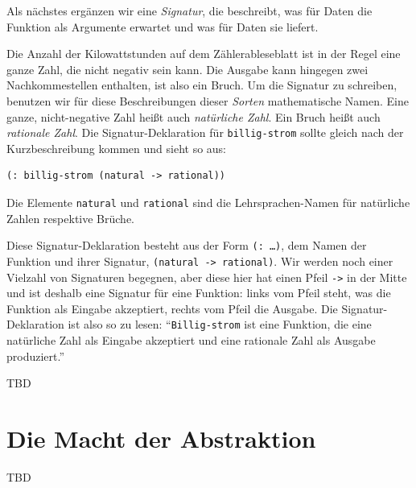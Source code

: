 Als nächstes ergänzen wir eine \textit{Signatur}, die
beschreibt, was für Daten die Funktion als Argumente erwartet und was
für Daten sie liefert.

Die Anzahl der Kilowattstunden auf dem Zählerableseblatt ist in der
Regel eine ganze Zahl, die nicht negativ sein kann.  Die Ausgabe kann
hingegen zwei Nachkommestellen enthalten, ist also ein Bruch.  Um die
Signatur zu schreiben, benutzen wir für diese Beschreibungen dieser
\textit{Sorten} mathematische Namen.  Eine ganze,
nicht-negative Zahl heißt auch \textit{natürliche
  Zahl}.  Ein Bruch heißt auch
\textit{rationale Zahl}.  Die
Signatur-Deklaration für \texttt{billig-strom} sollte gleich nach der
Kurzbeschreibung kommen und sieht so aus:
%
\begin{verbatim}
(: billig-strom (natural -> rational))
\end{verbatim}
%
Die Elemente \texttt{natural} und \texttt{rational} sind die
Lehrsprachen-Namen für natürliche Zahlen respektive Brüche.

Diese Signatur-Deklaration besteht aus der Form \texttt{(: \ldots)},
dem Namen der Funktion und ihrer Signatur, \texttt{(natural ->
  rational)}.  Wir werden noch einer Vielzahl von Signaturen begegnen,
aber diese hier hat einen Pfeil \texttt{->} in der Mitte und ist
deshalb eine Signatur für eine Funktion: links vom Pfeil steht, was
die Funktion als Eingabe akzeptiert, rechts vom Pfeil die Ausgabe. Die
Signatur-Deklaration ist also so zu lesen: "`\texttt{Billig-strom} ist
eine Funktion, die eine natürliche Zahl als Eingabe akzeptiert und
eine rationale Zahl als Ausgabe produziert."'

TBD


\section{Die Macht der Abstraktion}

TBD



